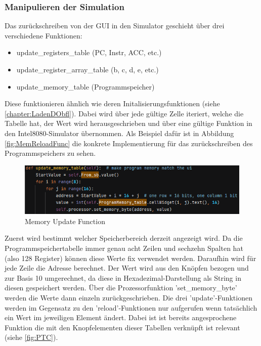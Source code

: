 \documentclass[12pt]{article}
\newcommand{\imgSpaceBefore}{\vspace{10pt}}
\begin{document}

\subsubsection{Manipulieren der Simulation}
Das zurückschreiben von der GUI in den Simulator geschieht über drei verschiedene Funktionen:\imgSpaceBefore

\begin{itemize}
	\item update\_registers\_table (PC, Instr, ACC, etc.)
	\item update\_register\_array\_table (b, c, d, e, etc.)
	\item update\_memory\_table (Programmspeicher)
\end{itemize}

\noindent
Diese funktionieren ähnlich wie deren Initalisierungsfunktionen (siehe \ref{chapter:LadenDObfl}). Dabei wird über jede gültige Zelle iteriert, welche die Tabelle hat, der Wert wird herausgeschrieben und über eine gültige Funktion in den Intel8080-Simulator übernommen. Als Beispiel dafür ist in Abbildung \ref{fig:MemReloadFunc} die konkrete Implementierung für das zurückschreiben des Programmspeichers zu sehen.\imgSpaceBefore

\begin{figure}[H]
\centering
\includegraphics[width=15cm]{bilder/UpdateProgMem}
\caption{Memory Update Function}
\label{fig:MemUpdateFunc}
\end{figure}

\noindent
Zuerst wird bestimmt welcher Speicherbereich derzeit angezeigt wird. Da die Programmspeichertabelle immer genau acht Zeilen und sechzehn Spalten hat (also 128 Register) können diese Werte fix verwendet werden. Daraufhin wird für jede Zeile die Adresse berechnet. Der Wert wird aus den Knöpfen bezogen und zur Basis 10 umgerechnet, da diese in Hexadezimal-Darstellung als String in diesen gespeichert werden. Über die Prozessorfunktion 'set\_memory\_byte' werden die Werte dann einzeln zurückgeschrieben. Die drei 'update'-Funktionen werden im Gegensatz zu den 'reload'-Funktionen nur aufgerufen wenn tatsächlich ein Wert im jeweiligen Element ändert. Dabei ist ist bereits angesprochene Funktion die mit den Knopfelementen dieser Tabellen verknüpft ist relevant (siehe \ref{fig:PTC}).\imgSpaceBefore
\end{document}
